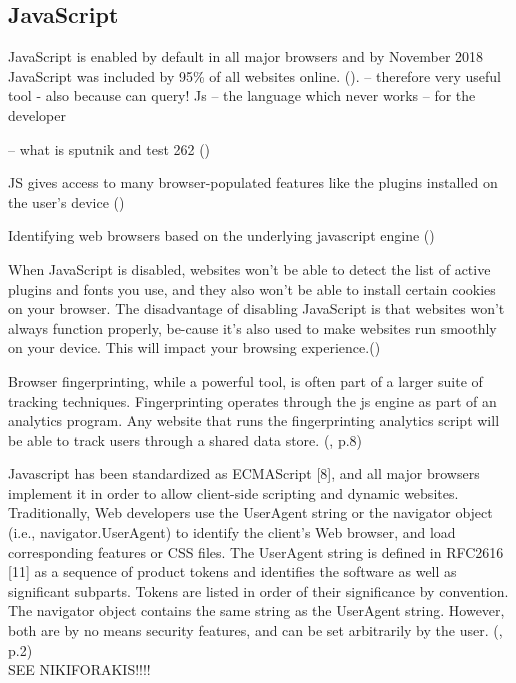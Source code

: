 \subsection{JavaScript}\label{JS}

JavaScript is enabled by default in all major browsers and by November 2018 JavaScript was included by 95\% of all websites online. (\textcite{w3techs18}).
-- therefore very useful tool - also because can query!
Js – the language which never works – for the developer

-- what is sputnik and test 262 ()

JS gives access to many browser-populated features like the plugins installed on the user’s device (\textcite{amiunique})

Identifying web browsers based on the underlying javascript engine
(\textcite{mulazzani13})

When JavaScript is disabled, websites won’t be able to detect the list of active plugins and fonts you use, and they also won’t be able to install certain cookies on your browser.
The disadvantage of disabling JavaScript is that websites won’t always function properly, be-cause it’s also used to make websites run smoothly on your device. This will impact your browsing experience.(\textcite{pixel18})

Browser fingerprinting, while a powerful tool, is often part of a larger suite of tracking techniques. Fingerprinting operates through the js engine as part of an analytics program. Any website that runs the fingerprinting analytics script will be able to track users through a shared data store.
(\textcite{havens16}, p.8)


Javascript has been standardized as ECMAScript [8],
and all major browsers implement it in order to allow
client-side scripting and dynamic websites. Traditionally,
Web developers use the UserAgent string or the navigator
object (i.e., navigator.UserAgent) to identify the client’s
Web browser, and load corresponding features or CSS files.
The UserAgent string is defined in RFC2616 [11] as a
sequence of product tokens and identifies the software as
well as significant subparts. Tokens are listed in order of their
significance by convention. The navigator object contains the
same string as the UserAgent string. However, both are by
no means security features, and can be set arbitrarily by the
user.
(\textcite{mulazzani13}, p.2)\\

SEE NIKIFORAKIS!!!!


